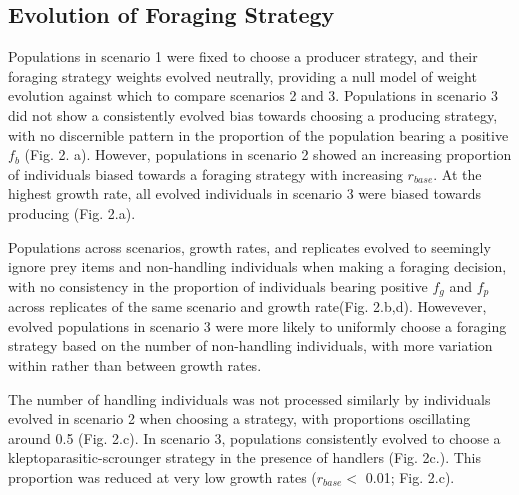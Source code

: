 \documentclass[11pt]{article}
\begin{document}
\subsection*{Evolution of Foraging Strategy}

Populations in scenario 1 were fixed to choose a producer strategy, and their foraging strategy weights evolved neutrally, providing a null model of weight evolution against which to compare scenarios 2 and 3.
Populations in scenario 3 did not show a consistently evolved bias towards choosing a producing strategy, with no discernible pattern in the proportion of the population bearing a positive $f_b$ (Fig. 2. a).
However, populations in scenario 2 showed an increasing proportion of individuals biased towards a foraging strategy with increasing $r_{base}$.
At the highest growth rate, all evolved individuals in scenario 3 were biased towards producing (Fig. 2.a).

Populations across scenarios, growth rates, and replicates evolved to seemingly ignore prey items and non-handling individuals when making a foraging decision, with no consistency in the proportion of individuals bearing positive $f_g$ and $f_p$ across replicates of the same scenario and growth rate(Fig. 2.b,d).
Howevever, evolved populations in scenario 3 were more likely to uniformly choose a foraging strategy based on the number of non-handling individuals, with more variation within rather than between growth rates.

The number of handling individuals was not processed similarly by individuals evolved in scenario 2 when choosing a strategy, with proportions oscillating around 0.5 (Fig. 2.c).
In scenario 3, populations consistently evolved to choose a kleptoparasitic-scrounger strategy in the presence of handlers (Fig. 2c.).
This proportion was reduced at very low growth rates ($r_{base} <$ 0.01; Fig. 2.c).
\end{document}
